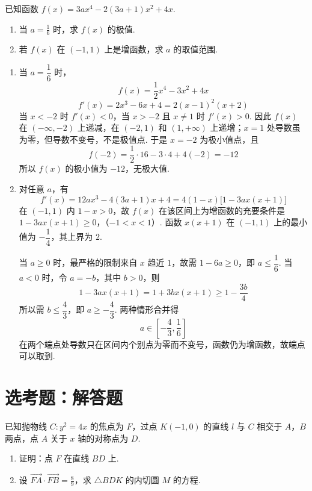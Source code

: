 \begin{problem}
已知函数 \( f(x) = 3ax^4 - 2(3a + 1)x^2 + 4x \).

\begin{enumerate}
\item 当 \(a = \frac{1}{6}\) 时，求 \(f(x)\) 的极值.
\item 若 \(f(x)\) 在 \(\left(-1,1\right)\) 上是增函数，求 \(a\) 的取值范围.
\end{enumerate}
\end{problem}

\begin{solution}
\begin{enumerate}
\item 当 \(a=\dfrac16\) 时，
\[
f(x)=\frac12x^4-3x^2+4x
\]
\[
f'(x)=2x^3-6x+4=2(x-1)^2(x+2)
\]
当 \(x<-2\) 时 \(f'(x)<0\)，当 \(x>-2\) 且 \(x\ne1\) 时 \(f'(x)>0\). 因此 \(f(x)\) 在 \(\left(-\infty,-2\right)\) 上递减，在 \((-2,1)\) 和 \((1,+\infty)\) 上递增；\(x=1\) 处导数虽为零，但导数不变号，不是极值点. 于是 \(x=-2\) 为极小值点，且
\[
f(-2)=\frac12\cdot16-3\cdot4+4(-2)=-12
\]
所以 \(f(x)\) 的极小值为 \(-12\)，无极大值.
\item 对任意 \(a\)，有
\[
f'(x)=12ax^3-4(3a+1)x+4
=4(1-x)\bigl[1-3ax(x+1)\bigr]
\]
在 \((-1,1)\) 内 \(1-x>0\)，故 \(f(x)\) 在该区间上为增函数的充要条件是
\(1-3ax(x+1)\geqslant0\)，（\(-1<x<1\)）.
函数 \(x(x+1)\) 在 \((-1,1)\) 上的最小值为 \(-\dfrac14\)，其上界为 \(2\).

当 \(a\geqslant0\) 时，最严格的限制来自 \(x\) 趋近 \(1\)，故需 \(1-6a\geqslant0\)，即 \(a\leqslant\dfrac16\). 当 \(a<0\) 时，令 \(a=-b\)，其中 \(b>0\)，则
\[
1-3ax(x+1)=1+3b x(x+1)\geqslant1-\frac{3b}{4}
\]
所以需 \(b\leqslant\dfrac43\)，即 \(a\geqslant-\dfrac43\). 两种情形合并得
\[
a\in\left[-\frac43,\frac16\right]
\]
在两个端点处导数只在区间内个别点为零而不变号，函数仍为增函数，故端点可以取到.
\end{enumerate}
\end{solution}

\section{选考题：解答题}

\begin{problem}
已知抛物线 \(C: y^{2} = 4x\) 的焦点为 \(F\)，过点 \(K(-1,0)\) 的直线 \(l\) 与 \(C\) 相交于 \(A\)，\(B\) 两点，点 \(A\) 关于 \(x\) 轴的对称点为 \(D\).

\begin{enumerate}
\item 证明：点 \(F\) 在直线 \(BD\) 上.
\item 设 \(\overrightarrow{FA} \cdot \overrightarrow{FB} = \frac{8}{9}\)，求 \(\triangle BDK\) 的内切圆 \(M\) 的方程.
\end{enumerate}
\end{problem}

